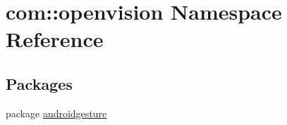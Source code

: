 \hypertarget{namespacecom_1_1openvision}{\section{com\-:\-:openvision \-Namespace \-Reference}
\label{namespacecom_1_1openvision}
}
\subsection*{\-Packages}
\begin{DoxyCompactItemize}
\item 
package \hyperlink{namespacecom_1_1openvision_1_1androidgesture}{androidgesture}
\end{DoxyCompactItemize}
